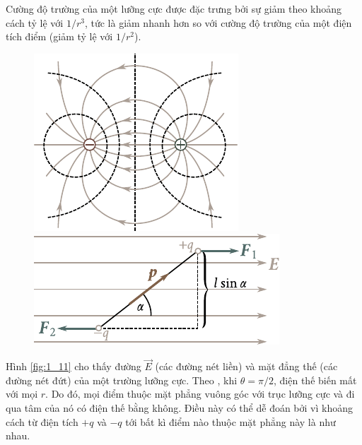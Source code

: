 Cường độ trường của một lưỡng cực được đặc trưng bởi sự giảm theo khoảng cách tỷ lệ với $1/r^3$, tức là giảm nhanh hơn so với cường độ trường của một điện tích điểm (giảm tỷ lệ với $1/r^2$).

\begin{figure}[!htb]
	\begin{minipage}[t]{0.5\linewidth}
		\begin{center}
			\includegraphics[scale=1]{figures/ch_01/fig_1_11.pdf}
			\caption[]{}
			\label{fig:1_11}
		\end{center}
	\end{minipage}
	\hspace{-0.05cm}
	\begin{minipage}[t]{0.5\linewidth}
		\begin{center}
			\includegraphics[scale=1]{figures/ch_01/fig_1_12.pdf}
			\caption[]{}
			\label{fig:1_12}
		\end{center}
	\end{minipage}
\vspace{-0.4cm}
\end{figure}

Hình \ref{fig:1_11} cho thấy đường $\vec{E}$ (các đường nét liền) và mặt đẳng thế (các đường nét đứt) của một trường lưỡng cực. Theo , khi $\theta=\pi/2$, điện thế biến mất với mọi $r$. Do đó, mọi điểm thuộc mặt phẳng vuông góc với trục lưỡng cực và đi qua tâm của nó có điện thế bằng không. Điều này có thể dễ đoán bởi vì khoảng cách từ điện tích $+q$ và $-q$ tới bất kì điểm nào thuộc mặt phẳng này là như nhau.

